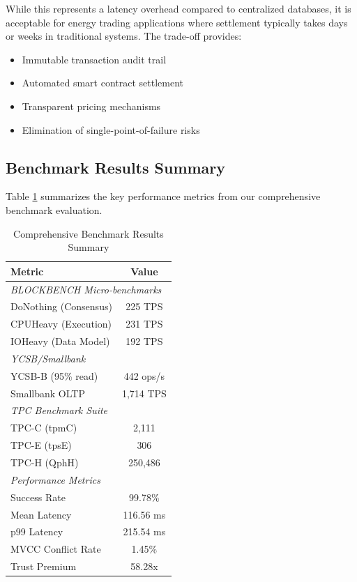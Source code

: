 \documentclass[conference]{IEEEtran}
\begin{document}
{While this represents a latency overhead compared to centralized databases, it is acceptable for energy trading applications where settlement typically takes days or weeks in traditional systems. The trade-off provides:
\begin{itemize}
    \item Immutable transaction audit trail
    \item Automated smart contract settlement
    \item Transparent pricing mechanisms
    \item Elimination of single-point-of-failure risks
\end{itemize}

\subsection{Benchmark Results Summary}
Table \ref{tab:benchmark-results} summarizes the key performance metrics from our comprehensive benchmark evaluation.

\begin{table}[htbp]
\caption{Comprehensive Benchmark Results Summary}
\begin{center}
\begin{tabular}{lc}
\toprule
\textbf{Metric} & \textbf{Value} \\
\midrule
\multicolumn{2}{l}{\textit{BLOCKBENCH Micro-benchmarks}} \\
\midrule
DoNothing (Consensus) & 225 TPS \\
CPUHeavy (Execution) & 231 TPS \\
IOHeavy (Data Model) & 192 TPS \\
\midrule
\multicolumn{2}{l}{\textit{YCSB/Smallbank}} \\
\midrule
YCSB-B (95\% read) & 442 ops/s \\
Smallbank OLTP & 1,714 TPS \\
\midrule
\multicolumn{2}{l}{\textit{TPC Benchmark Suite}} \\
\midrule
TPC-C (tpmC) & 2,111 \\
TPC-E (tpsE) & 306 \\
TPC-H (QphH) & 250,486 \\
\midrule
\multicolumn{2}{l}{\textit{Performance Metrics}} \\
\midrule
Success Rate & 99.78\% \\
Mean Latency & 116.56 ms \\
p99 Latency & 215.54 ms \\
MVCC Conflict Rate & 1.45\% \\
Trust Premium & 58.28x \\
\bottomrule
\end{tabular}
\label{tab:benchmark-results}
\end{center}
\end{table}

}
\end{document}
